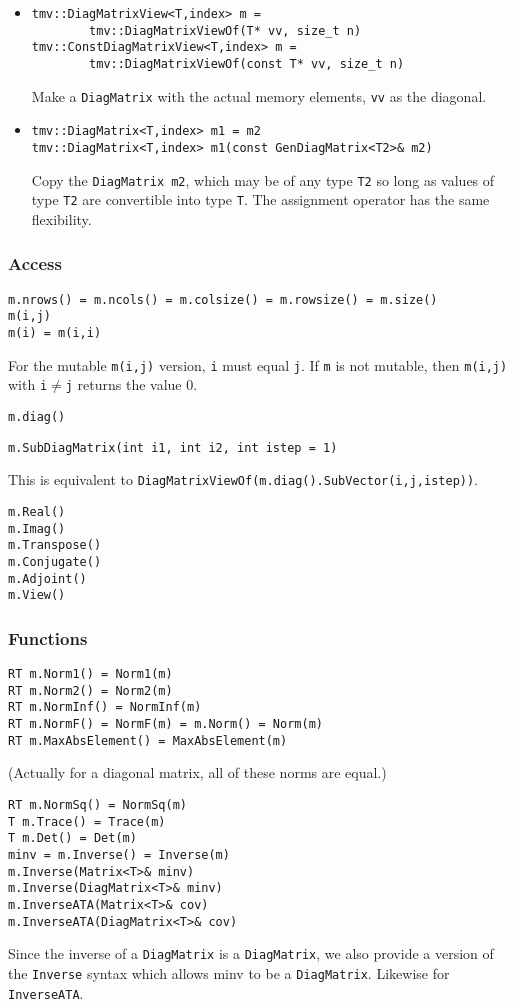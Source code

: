 \documentclass[twoside,letterpaper,11pt]{article}
\renewcommand{\tt}[1]{{\texttt {#1}}}
\begin{document}
\begin{itemize}
\item
\begin{verbatim}
tmv::DiagMatrixView<T,index> m = 
        tmv::DiagMatrixViewOf(T* vv, size_t n)
tmv::ConstDiagMatrixView<T,index> m = 
        tmv::DiagMatrixViewOf(const T* vv, size_t n)
\end{verbatim}
Make a \tt{DiagMatrix} with the actual memory elements, \tt{vv} as the diagonal.

\item
\begin{verbatim}
tmv::DiagMatrix<T,index> m1 = m2
tmv::DiagMatrix<T,index> m1(const GenDiagMatrix<T2>& m2)
\end{verbatim}
Copy the \tt{DiagMatrix m2}, which may be of any type \tt{T2} so long
as values of type \tt{T2} are convertible into type \tt{T}.
The assignment operator has the same flexibility.

\end{itemize}


\subsubsection{Access}

\begin{verbatim}
m.nrows() = m.ncols() = m.colsize() = m.rowsize() = m.size()
m(i,j)
m(i) = m(i,i)
\end{verbatim}
For the mutable \tt{m(i,j)} version, 
\tt{i} must equal \tt{j}.
If \tt{m} is not mutable, then \tt{m(i,j)} with \tt{i}$\neq$\tt{j} returns the 
value 0.

\begin{verbatim}
m.diag()
\end{verbatim}

\begin{verbatim}
m.SubDiagMatrix(int i1, int i2, int istep = 1)
\end{verbatim}
This is equivalent to \tt{DiagMatrixViewOf(m.diag().SubVector(i,j,istep))}.
\begin{verbatim}
m.Real()
m.Imag()
m.Transpose()
m.Conjugate()
m.Adjoint()
m.View()
\end{verbatim}

\subsubsection{Functions}

\begin{verbatim}
RT m.Norm1() = Norm1(m)
RT m.Norm2() = Norm2(m)
RT m.NormInf() = NormInf(m)
RT m.NormF() = NormF(m) = m.Norm() = Norm(m)
RT m.MaxAbsElement() = MaxAbsElement(m)
\end{verbatim}
(Actually for a diagonal matrix, all of these norms are equal.)
\begin{verbatim}
RT m.NormSq() = NormSq(m)
T m.Trace() = Trace(m)
T m.Det() = Det(m)
minv = m.Inverse() = Inverse(m)
m.Inverse(Matrix<T>& minv)
m.Inverse(DiagMatrix<T>& minv)
m.InverseATA(Matrix<T>& cov)
m.InverseATA(DiagMatrix<T>& cov)
\end{verbatim}
Since the inverse of a \tt{DiagMatrix} is a \tt{DiagMatrix},
we also provide a version of the \tt{Inverse} syntax which allows minv
to be a \tt{DiagMatrix}.  Likewise for \tt{InverseATA}.
\end{document}
